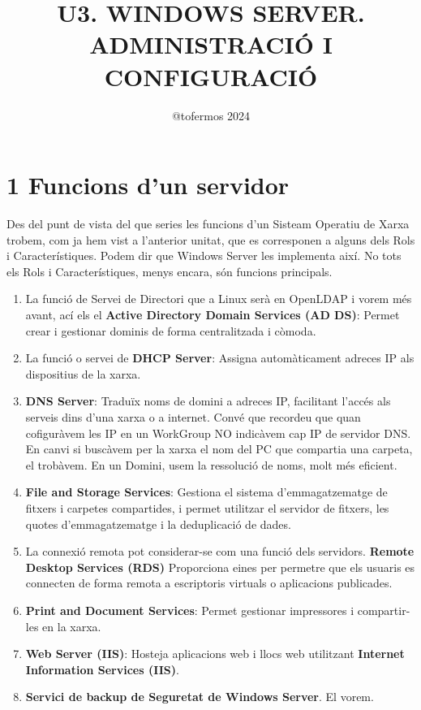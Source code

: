 \documentclass[
  a4paper,
]{article}
\title{U3. WINDOWS SERVER. ADMINISTRACIÓ I CONFIGURACIÓ}
\author{@tofermos 2024}
\date{}
\begin{document}
\maketitle

{
\setcounter{tocdepth}{2}
\tableofcontents
}
\newpage
\renewcommand\tablename{Tabla}

\section{1 Funcions d'un servidor}\label{funcions-dun-servidor}

Des del punt de vista del que series les funcions d'un Sisteam Operatiu
de Xarxa trobem, com ja hem vist a l'anterior unitat, que es corresponen
a alguns dels Rols i Característiques. Podem dir que Windows Server les
implementa així. No tots els Rols i Característiques, menys encara, són
funcions principals.

\begin{enumerate}
\def\labelenumi{\arabic{enumi}.}
\item
  La funció de Servei de Directori que a Linux serà en OpenLDAP i vorem
  més avant, ací els el \textbf{Active Directory Domain Services (AD
  DS)}: Permet crear i gestionar dominis de forma centralitzada i
  còmoda.
\item
  La funció o servei de \textbf{DHCP Server}: Assigna automàticament
  adreces IP als dispositius de la xarxa.
\item
  \textbf{DNS Server}: Traduïx noms de domini a adreces IP, facilitant
  l'accés als serveis dins d'una xarxa o a internet. Convé que recordeu
  que quan cofiguràvem les IP en un WorkGroup NO indicàvem cap IP de
  servidor DNS. En canvi si buscàvem per la xarxa el nom del PC que
  compartia una carpeta, el trobàvem. En un Domini, usem la ressolució
  de noms, molt més eficient.
\item
  \textbf{File and Storage Services}: Gestiona el sistema
  d'emmagatzematge de fitxers i carpetes compartides, i permet utilitzar
  el servidor de fitxers, les quotes d'emmagatzematge i la deduplicació
  de dades.
\item
  La connexió remota pot considerar-se com una funció dels servidors.
  \textbf{Remote Desktop Services (RDS)} Proporciona eines per permetre
  que els usuaris es connecten de forma remota a escriptoris virtuals o
  aplicacions publicades.
\item
  \textbf{Print and Document Services}: Permet gestionar impressores i
  compartir-les en la xarxa.
\item
  \textbf{Web Server (IIS)}: Hosteja aplicacions web i llocs web
  utilitzant \textbf{Internet Information Services (IIS)}.
\item
  \textbf{Servici de backup de Seguretat de Windows Server}. El vorem.
\end{enumerate}
\end{document}
